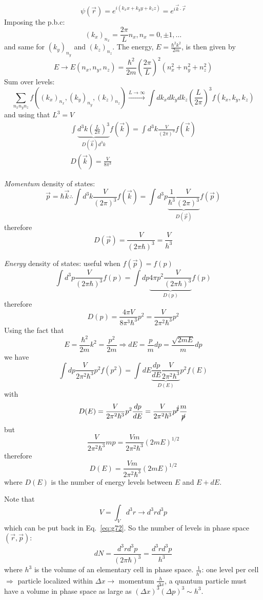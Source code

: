 \documentclass[12pt]{article}
\newcommand{\be}{\begin{equation}}
\newcommand{\ee}{\end{equation}}
\begin{document}
\setcounter{equation}{67}
\be
\psi(\vec{r}) = e^{i(k_x x + k_y y + k_z z)} = e^{i \vec{k} \cdot \vec{r}}
\ee
Imposing the p.b.c:
\[
(k_x)_{n_x} = \frac{2 \pi}{L} n_{x}, n_{x}=0, \pm 1, \ldots
\]
and same for $(k_y)_{n_y}$ and $(k_z)_{n_z}$.
The energy, $E=\frac{\hbar^{2} k^{2}}{2 m}$, is then given by
\be
E \rightarrow E\left(n_{x}, n_{y}, n_{z}\right)=\frac{\hbar^{2}}{2 m}\left(\frac{2 \pi}{L}\right)^{2}\left(n_{x}^{2}+n_{y}^{2}+n_{z}^{2}\right)
\ee
Sum over levels:
\be
\sum_{n_{x} n_{y} n_{z}} f\left(\left(k_{x}\right)_{n_{x}},\left(k_{y}\right)_{n_{y}},\left(k_{z}\right)_{n_{z}}\right)
\xrightarrow{L \to \infty}
\int d k_{x} d k_{y} d k_{z}\left(\frac{L}{2 \pi}\right)^{3} f\left(k_{x}, k_{y}, k_{z}\right)
\ee
and using that $L^3 = V$
\be
\begin{gathered}
\int \underbrace{d^{3} k\left(\frac{L}{2 \pi}\right)^{3}}%
_{D(\vec{k}) d^3k} f(\vec{k})=\int d^{3} k \frac{V}{(2 \pi)^{3}} f(\vec{k})\\
D(\vec{k}) = \frac{V}{8\pi^3}
\end{gathered}
\ee

\emph{Momentum} density of states:
\[
\vec{p} = \hbar \vec{k} \therefore 
\int d^{3} k \frac{V}{(2 \pi)^{3}} f(\vec{k}) = 
\int d^{3} p \underbrace{\frac{1}{\hbar^3}\frac{V}{(2 \pi)^{3}}}_{D(\vec{p})} f(\vec{p})
\]
therefore
\be
D(\vec{p}) = \frac{V}{(2 \pi \hbar)^{3}}=\frac{V}{h^{3}}
\label{eq:g72}
\ee

\emph{Energy} density of states: useful when $f(\vec{p}) = f(p)$
\[
\int d^{3} p \frac{V}{(2 \pi \hbar)^{3}} f(p)=\int d p \underbrace{4 \pi p^{2} \frac{V}{(2 \pi \hbar)^{3}}}%
_{D(p)} f(p)
\]
therefore
\be
D(p)=\frac{4 \pi V}{8 \pi^{3} \hbar^{3}} p^{2}=\frac{V}{2 \pi^{2} \hbar^{3}} p^{2}
\ee
Using the fact that 
\[
E=\frac{\hbar^{2}}{2 m} k^{2}=\frac{p^{2}}{2 m} \Rightarrow
d E=\frac{p}{m} d p = \frac{\sqrt{2 m E}}{m} d p
\]
we have
\be
\int d p \frac{V}{2 \pi^{2} \hbar^{3}} p^{2} f\left(p^{2}\right)=\int d E 
\underbrace{\frac{d p}{d E} \frac{V}{2 \pi^{2} \hbar^{3}}}_{D(E)} p^{2} f(E)
\ee
with
\[
D(E)=\frac{V}{2 \pi^{2} \hbar^{3}} p^{2} \frac{d p}{d E}=\frac{V}{2 \pi^{2} \hbar^{3}} p^{\cancel{2}} \frac{m}{\cancel{p}}
\]
but
\[
\frac{V}{2 \pi^{2} \hbar^{3}} m p=\frac{V m}{2 \pi^{2} \hbar^{3}}(2 m E)^{1 / 2}
\]
therefore
\be
D(E)=\frac{V m}{2 \pi^{2} \hbar^{3}}(2 m E)^{1 / 2}
\ee
where $D(E)$ is the number of energy levels between $E$ and $E+dE$.

Note that 
\be
V = \int_V d^3r \to d^3r d^3p
\ee
which can be put back in Eq.~\eqref{eq:g72}. So the
number of levels in phase space $(\vec{r},\vec{p})$:
\be
d N=\frac{d^{3} r d^{3} p}{(2 \pi \hbar)^{3}}=\frac{d^{3} r d^{3} p}{h^{3}}
\ee
where $h^3$ is the volume of an elementary cell in phase space.
$\frac{1}{h^3}$: one level per cell
$\Rightarrow$
particle localized within $\Delta x \rightarrow$ momentum $\frac{h}{\Delta x}$,
a quantum particle must have a
volume in phase space as large as $(\Delta x)^{3}(\Delta p)^{3} \sim h^{3}$.
\end{document}
